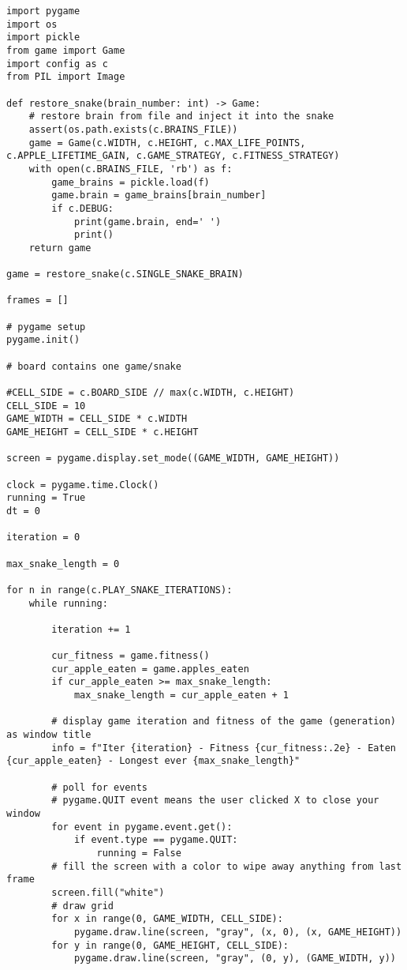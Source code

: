 \documentclass[11pt,a4paper]{article}
\begin{document}
\begin{verbatim}
import pygame
import os
import pickle
from game import Game
import config as c
from PIL import Image

def restore_snake(brain_number: int) -> Game:
    # restore brain from file and inject it into the snake
    assert(os.path.exists(c.BRAINS_FILE))
    game = Game(c.WIDTH, c.HEIGHT, c.MAX_LIFE_POINTS, c.APPLE_LIFETIME_GAIN, c.GAME_STRATEGY, c.FITNESS_STRATEGY)
    with open(c.BRAINS_FILE, 'rb') as f:
        game_brains = pickle.load(f)
        game.brain = game_brains[brain_number]
        if c.DEBUG:
            print(game.brain, end=' ')
            print()
    return game

game = restore_snake(c.SINGLE_SNAKE_BRAIN)

frames = []

# pygame setup
pygame.init()

# board contains one game/snake

#CELL_SIDE = c.BOARD_SIDE // max(c.WIDTH, c.HEIGHT)
CELL_SIDE = 10
GAME_WIDTH = CELL_SIDE * c.WIDTH
GAME_HEIGHT = CELL_SIDE * c.HEIGHT

screen = pygame.display.set_mode((GAME_WIDTH, GAME_HEIGHT))

clock = pygame.time.Clock()
running = True
dt = 0

iteration = 0

max_snake_length = 0

for n in range(c.PLAY_SNAKE_ITERATIONS):
    while running:

        iteration += 1

        cur_fitness = game.fitness()
        cur_apple_eaten = game.apples_eaten
        if cur_apple_eaten >= max_snake_length:
            max_snake_length = cur_apple_eaten + 1

        # display game iteration and fitness of the game (generation) as window title
        info = f"Iter {iteration} - Fitness {cur_fitness:.2e} - Eaten {cur_apple_eaten} - Longest ever {max_snake_length}"

        # poll for events
        # pygame.QUIT event means the user clicked X to close your window
        for event in pygame.event.get():
            if event.type == pygame.QUIT:
                running = False
        # fill the screen with a color to wipe away anything from last frame
        screen.fill("white")
        # draw grid
        for x in range(0, GAME_WIDTH, CELL_SIDE):
            pygame.draw.line(screen, "gray", (x, 0), (x, GAME_HEIGHT))
        for y in range(0, GAME_HEIGHT, CELL_SIDE):
            pygame.draw.line(screen, "gray", (0, y), (GAME_WIDTH, y))


\end{verbatim}
\end{document}
